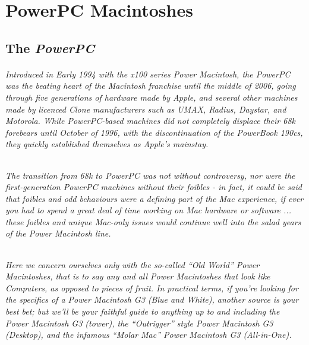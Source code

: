 
\part{PowerPC Macintoshes}

\chapter{The \textsl{\textbf{\textrm{PowerPC}}\texttrademark}}

\paragraph{%
Introduced in Early 1994 with the x100 series Power Macintosh, the PowerPC was %
the beating heart of the Macintosh franchise until the middle of 2006, going %
through five generations of hardware made by Apple, and several other machines %
made by licenced Clone manufacturers such as UMAX, Radius, Daystar, and %
Motorola. While PowerPC-based machines did not completely displace their 68k %
forebears until October of 1996, with the discontinuation of the PowerBook 190cs, %
they quickly established themselves as Apple's mainstay. %
}

\paragraph{%
The transition from 68k to PowerPC was not without controversy, nor were the %
first-generation PowerPC machines without their foibles - in fact, it could be %
said that foibles and odd behaviours were a defining part of the Mac experience, %
if ever you had to spend a great deal of time working on Mac hardware or software%
... %
these foibles and unique Mac-only issues would continue well into the salad years %
of the Power Macintosh line. %
}

\paragraph{%
Here we concern ourselves only with the so-called ``Old World'' Power Macintoshes, %
that is to say any and all Power Macintoshes that look like Computers, as opposed %
to pieces of fruit. In practical terms, if you're looking for the specifics of a %
Power Macintosh G3 (Blue and White), another source is your best bet; but we'll %
be your faithful guide to anything up to and including the Power Macintosh G3 %
(tower), the ``Outrigger'' style Power Macintosh G3 (Desktop), and the infamous %
``Molar Mac'' Power Macintosh G3 (All-in-One). %
}
